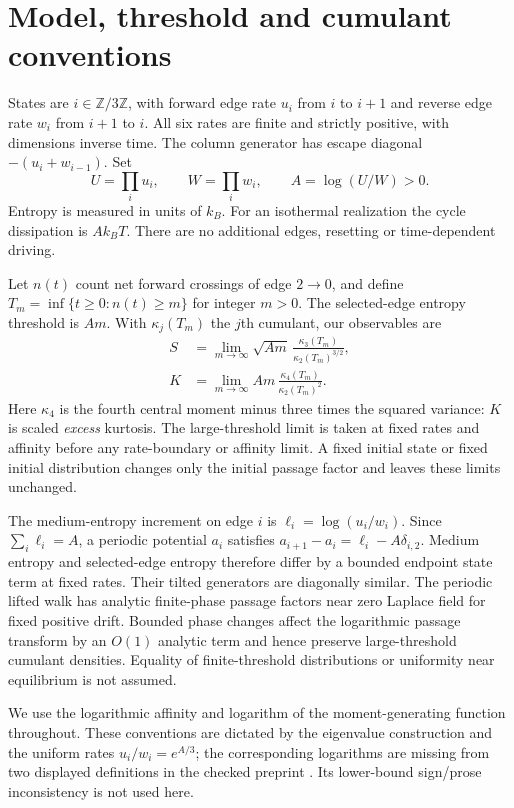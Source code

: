 \documentclass[11pt,a4paper]{article}
\newcommand{\kap}{\kappa}
\begin{document}
\section{Model, threshold and cumulant conventions}
States are $i\in\mathbb Z/3\mathbb Z$, with forward edge rate $u_i$ from $i$ to $i+1$ and reverse edge rate $w_i$ from $i+1$ to $i$. All six rates are finite and strictly positive, with dimensions inverse time. The column generator has escape diagonal $-(u_i+w_{i-1})$. Set
\begin{equation}
 U=\prod_i u_i,\qquad W=\prod_i w_i,\qquad A=\log(U/W)>0.
\end{equation}
Entropy is measured in units of $k_B$. For an isothermal realization the cycle dissipation is $Ak_BT$. There are no additional edges, resetting or time-dependent driving.

Let $n(t)$ count net forward crossings of edge $2\to0$, and define $T_m=\inf\{t\geq0:n(t)\geq m\}$ for integer $m>0$. The selected-edge entropy threshold is $Am$. With $\kap_j(T_m)$ the $j$th cumulant, our observables are
\begin{align}
 S&=\lim_{m\to\infty}\sqrt{Am}\,\frac{\kap_3(T_m)}{\kap_2(T_m)^{3/2}},\label{eq:obsS}\\
 K&=\lim_{m\to\infty}Am\,\frac{\kap_4(T_m)}{\kap_2(T_m)^2}.\label{eq:obsK}
\end{align}
Here $\kap_4$ is the fourth central moment minus three times the squared variance: $K$ is scaled \emph{excess} kurtosis. The large-threshold limit is taken at fixed rates and affinity before any rate-boundary or affinity limit. A fixed initial state or fixed initial distribution changes only the initial passage factor and leaves these limits unchanged.

The medium-entropy increment on edge $i$ is $\ell_i=\log(u_i/w_i)$. Since $\sum_i\ell_i=A$, a periodic potential $a_i$ satisfies $a_{i+1}-a_i=\ell_i-A\delta_{i,2}$. Medium entropy and selected-edge entropy therefore differ by a bounded endpoint state term at fixed rates. Their tilted generators are diagonally similar. The periodic lifted walk has analytic finite-phase passage factors near zero Laplace field for fixed positive drift. Bounded phase changes affect the logarithmic passage transform by an $O(1)$ analytic term and hence preserve large-threshold cumulant densities. Equality of finite-threshold distributions or uniformity near equilibrium is not assumed.

We use the logarithmic affinity and logarithm of the moment-generating function throughout. These conventions are dictated by the eigenvalue construction and the uniform rates $u_i/w_i=e^{A/3}$; the corresponding logarithms are missing from two displayed definitions in the checked preprint \cite{Wampler2021}. Its lower-bound sign/prose inconsistency is not used here.
\end{document}
